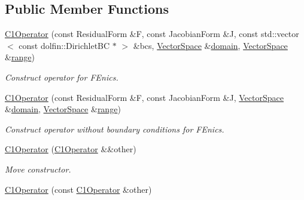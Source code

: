 \subsection*{Public Member Functions}
\begin{DoxyCompactItemize}
\item 
\hyperlink{classSpacy_1_1FEniCS_1_1C1Operator_af23d84bd48d0902011bf80ba2f4cd394_af23d84bd48d0902011bf80ba2f4cd394}{C1\+Operator} (const Residual\+Form \&F, const Jacobian\+Form \&J, const std\+::vector$<$ const dolfin\+::\+Dirichlet\+B\+C $\ast$ $>$ \&bcs, \hyperlink{classSpacy_1_1VectorSpace}{Vector\+Space} \&\hyperlink{classSpacy_1_1OperatorBase_a2588f9b3e0188820c4c494e63293dc6f_a2588f9b3e0188820c4c494e63293dc6f}{domain}, \hyperlink{classSpacy_1_1VectorSpace}{Vector\+Space} \&\hyperlink{classSpacy_1_1OperatorBase_ab19d3b7a6f290b1079248f1e567e53d6_ab19d3b7a6f290b1079248f1e567e53d6}{range})
\begin{DoxyCompactList}\small\item\em Construct operator for F\+Enics. \end{DoxyCompactList}\item 
\hyperlink{classSpacy_1_1FEniCS_1_1C1Operator_afe6c4eb8960290212a16a1eca2267b48_afe6c4eb8960290212a16a1eca2267b48}{C1\+Operator} (const Residual\+Form \&F, const Jacobian\+Form \&J, \hyperlink{classSpacy_1_1VectorSpace}{Vector\+Space} \&\hyperlink{classSpacy_1_1OperatorBase_a2588f9b3e0188820c4c494e63293dc6f_a2588f9b3e0188820c4c494e63293dc6f}{domain}, \hyperlink{classSpacy_1_1VectorSpace}{Vector\+Space} \&\hyperlink{classSpacy_1_1OperatorBase_ab19d3b7a6f290b1079248f1e567e53d6_ab19d3b7a6f290b1079248f1e567e53d6}{range})
\begin{DoxyCompactList}\small\item\em Construct operator without boundary conditions for F\+Enics. \end{DoxyCompactList}\item 
\hyperlink{classSpacy_1_1FEniCS_1_1C1Operator_a4ab2b79f50f05b4cc4403269dad87e1e_a4ab2b79f50f05b4cc4403269dad87e1e}{C1\+Operator} (\hyperlink{classSpacy_1_1FEniCS_1_1C1Operator}{C1\+Operator} \&\&other)
\begin{DoxyCompactList}\small\item\em Move constructor. \end{DoxyCompactList}\item 
\hyperlink{classSpacy_1_1FEniCS_1_1C1Operator_a8bedc9295f43ebe21be9e2a9337da1e5_a8bedc9295f43ebe21be9e2a9337da1e5}{C1\+Operator} (const \hyperlink{classSpacy_1_1FEniCS_1_1C1Operator}{C1\+Operator} \&other)

\end{DoxyCompactItemize}
